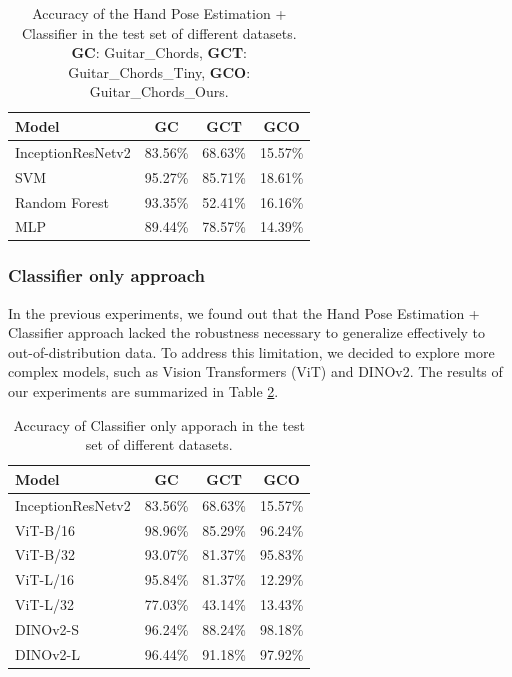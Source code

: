 \documentclass[10pt,twocolumn,letterpaper]{article}
\begin{document}

\begin{table}[h]
    \centering
    \begin{tabular}{lccc}
        \toprule
        \textbf{Model}    & \textbf{GC} & \textbf{GCT} & \textbf{GCO} \\
        \midrule
        InceptionResNetv2 & 83.56\%     & 68.63\%      & 15.57\%      \\
        \midrule
        SVM               & 95.27\%     & 85.71\%      & 18.61\%      \\
        Random Forest     & 93.35\%     & 52.41\%      & 16.16\%      \\
        MLP               & 89.44\%     & 78.57\%      & 14.39\%      \\
        \bottomrule
    \end{tabular}
    \caption{Accuracy of the Hand Pose Estimation + Classifier in the test set of different datasets. \textbf{GC}: Guitar\_Chords, \textbf{GCT}: Guitar\_Chords\_Tiny, \textbf{GCO}: Guitar\_Chords\_Ours.}
    \label{tab:handpose-classifier-results}
\end{table}

\subsubsection{Classifier only approach}
In the previous experiments, we found out that the Hand Pose Estimation + Classifier approach lacked the robustness necessary to generalize effectively to out-of-distribution data. To address this limitation, we decided to explore more complex models, such as Vision Transformers (ViT) and DINOv2. The results of our experiments are summarized in Table \ref{tab:transformer-models-results}.

\begin{table}[h]
    \centering
    \begin{tabular}{lccc}
        \toprule
        \textbf{Model}    & \textbf{GC} & \textbf{GCT} & \textbf{GCO} \\
        \midrule
        InceptionResNetv2 & 83.56\%     & 68.63\%      & 15.57\%      \\
        \midrule
        ViT-B/16          & 98.96\%     & 85.29\%      & 96.24\%      \\
        ViT-B/32          & 93.07\%     & 81.37\%      & 95.83\%      \\
        ViT-L/16          & 95.84\%     & 81.37\%      & 12.29\%      \\
        ViT-L/32          & 77.03\%     & 43.14\%      & 13.43\%      \\
        DINOv2-S          & 96.24\%     & 88.24\%      & 98.18\%      \\
        DINOv2-L          & 96.44\%     & 91.18\%      & 97.92\%      \\
        \bottomrule
    \end{tabular}
    \caption{Accuracy of Classifier only apporach in the test set of different datasets.}
    \label{tab:transformer-models-results}
\end{table}
\end{document}
